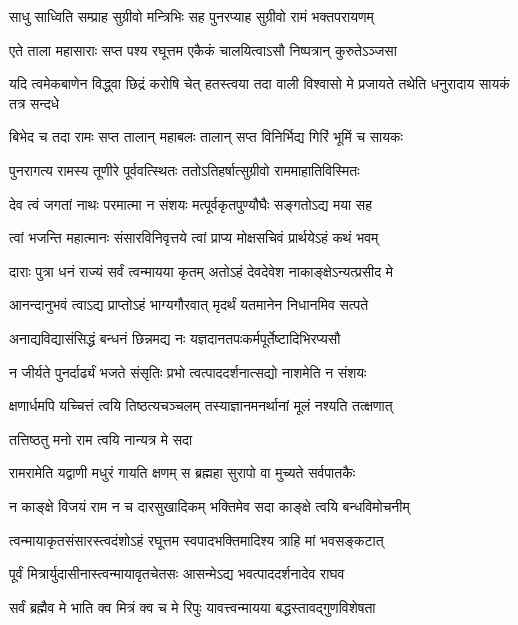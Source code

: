 \twolineshloka
{साधु साध्विति सम्प्राह सुग्रीवो मन्त्रिभिः सह}
{पुनरप्याह सुग्रीवो रामं भक्तपरायणम्} %

\twolineshloka
{एते ताला महासाराः सप्त पश्य रघूत्तम}
{एकैकं चालयित्वाऽसौ निष्पत्रान् कुरुतेऽञ्जसा} %

\threelineshloka
{यदि त्वमेकबाणेन विद्ध्वा छिद्रं करोषि चेत्}
{हतस्त्वया तदा वाली विश्वासो मे प्रजायते}
{तथेति धनुरादाय सायकं तत्र सन्दधे} %

\twolineshloka
{बिभेद च तदा रामः सप्त तालान् महाबलः}
{तालान् सप्त विनिर्भिद्य गिरिं भूमिं च सायकः} %

\twolineshloka
{पुनरागत्य रामस्य तूणीरे पूर्ववत्स्थितः}
{ततोऽतिहर्षात्सुग्रीवो राममाहातिविस्मितः} %

\twolineshloka
{देव त्वं जगतां नाथः परमात्मा न संशयः}
{मत्पूर्वकृतपुण्यौघैः सङ्गतोऽद्य मया सह} %

\twolineshloka
{त्वां भजन्ति महात्मानः संसारविनिवृत्तये}
{त्वां प्राप्य मोक्षसचिवं प्रार्थयेऽहं कथं भवम्} %

\twolineshloka
{दाराः पुत्रा धनं राज्यं सर्वं त्वन्मायया कृतम्}
{अतोऽहं देवदेवेश नाकाङ्क्षेऽन्यत्प्रसीद मे} %

\twolineshloka
{आनन्दानुभवं त्वाऽद्य प्राप्तोऽहं भाग्यगौरवात्}
{मृदर्थं यतमानेन निधानमिव सत्पते} %

\twolineshloka
{अनाद्यविद्यासंसिद्धं बन्धनं छिन्नमद्य नः}
{यज्ञदानतपःकर्मपूर्तेष्टादिभिरप्यसौ} %

\twolineshloka
{न जीर्यते पुनर्दार्ढ्यं भजते संसृतिः प्रभो}
{त्वत्पाददर्शनात्सद्यो नाशमेति न संशयः} %

\twolineshloka
{क्षणार्धमपि यच्चित्तं त्वयि तिष्ठत्यचञ्चलम्}
{तस्याज्ञानमनर्थानां मूलं नश्यति तत्क्षणात्} %

\onelineshloka
{तत्तिष्ठतु मनो राम त्वयि नान्यत्र मे सदा} %

\twolineshloka
{रामरामेति यद्वाणी मधुरं गायति क्षणम्}
{स ब्रह्महा सुरापो वा मुच्यते सर्वपातकैः} %

\twolineshloka
{न काङ्क्षे विजयं राम न च दारसुखादिकम्}
{भक्तिमेव सदा काङ्क्षे त्वयि बन्धविमोचनीम्} %

\twolineshloka
{त्वन्मायाकृतसंसारस्त्वदंशोऽहं रघूत्तम}
{स्वपादभक्तिमादिश्य त्राहि मां भवसङ्कटात्} %

\twolineshloka
{पूर्वं मित्रार्युदासीनास्त्वन्मायावृतचेतसः}
{आसन्मेऽद्य भवत्पाददर्शनादेव राघव} %

\twolineshloka
{सर्वं ब्रह्मैव मे भाति क्व मित्रं क्व च मे रिपुः}
{यावत्त्वन्मायया बद्धस्तावद्गुणविशेषता} %

